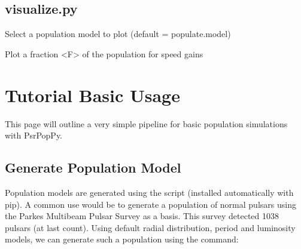 \documentclass[letterpaper,10pt,english]{sphinxmanual}
\begin{document}
\section{visualize.py}
\label{\detokenize{cmd-line-docs:visualize-py}}\label{\detokenize{cmd-line-docs:visualize-docs}}

\begin{fulllineitems}
\label{\detokenize{cmd-line-docs:cmdoption-visualize.py-f}}
\pysigstartsignatures
\pysigline
{}
\pysigstopsignatures
\sphinxAtStartPar
Select a population model to plot (default = populate.model)

\end{fulllineitems}


\begin{fulllineitems}
\label{\detokenize{cmd-line-docs:cmdoption-visualize.py-frac}}
\pysigstartsignatures
\pysigline
{}
\pysigstopsignatures
\sphinxAtStartPar
Plot a fraction \textless{}F\textgreater{} of the population for speed gains

\end{fulllineitems}


\sphinxstepscope


\chapter{Tutorial \sphinxhyphen{} Basic Usage}
\label{\detokenize{tutorial-basic:tutorial-basic-usage}}\label{\detokenize{tutorial-basic:tutorial-basic}}\label{\detokenize{tutorial-basic::doc}}
\sphinxAtStartPar
This page will outline a very simple pipeline for basic population
simulations with PsrPopPy.


\section{Generate Population Model}
\label{\detokenize{tutorial-basic:generate-population-model}}\label{\detokenize{tutorial-basic:generate-population}}
\sphinxAtStartPar
Population models are generated using the  script (installed
automatically with pip). A common use would be to generate a population of
normal pulsars using the Parkes Multibeam Pulsar Survey as a basis. This
survey detected 1038 pulsars (at last count). Using default radial distribution,
period and luminosity models, we can generate such a population using the command:
\end{document}
